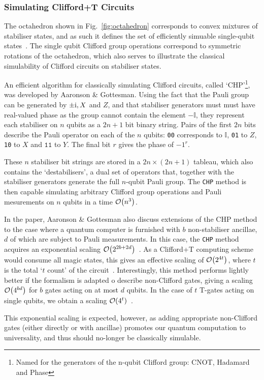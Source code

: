 \documentclass{standalone}
\begin{document}
\subsubsection{Simulating Clifford+T Circuits}\label{sec:CHP}
The octahedron shown in Fig.~\ref{fig:octahedron} corresponds to convex mixtures of stabiliser states, and as such it defines the set of efficiently simuable single-qubit states~\cite{Howard2014}. The single qubit Clifford group operations correspond to symmetric rotations of the octahedron, which also serves to illustrate the classical simulability of Clifford circuits on stabiliser states. 
\par
An efficient algorithm for classically simulating Clifford circuits, called `CHP'\footnote{Named for the generators of the n-qubit Clifford group: CNOT, Hadamard and Phase}, was developed by Aaronson \& Gottesman. Using the fact that the Pauli group can be generated by $\pm\mathrm{i}, X$ and $Z$, and that stabiliser generators must must have real-valued phase as the group cannot contain the element $-\mathbb{I}$, they represent each stabiliser on $n$ qubits as a $2n+1$ bit binary string. Pairs of the first $2n$ bits describe the Pauli operator on each of the $n$ qubits: \texttt{00} corresponds to $\mathbb{I}$, \texttt{01} to $Z$, \texttt{10} to $X$ and $\texttt{11}$ to $Y$. The final bit $r$ gives the phase of $-1^{r}$.
\par
These $n$ stabiliser bit strings are stored in a $2n\times(2n+1)$ tableau, which also contains the `destabilisers', a dual set of operators that, together with the stabiliser generators generate the full $n$-qubit Pauli group. The \texttt{CHP} method is then capable simulating arbitrary Clifford group operations and Pauli mesurements on $n$ qubits in a time $\order{n^{3}}$.
\par
In the paper, Aaronson \& Gottesman also discuss extensions of the CHP method to the case where a quantum computer is furnished with $b$ non-stabiliser ancillae, $d$ of which are subject to Pauli measurements. In this case, the \texttt{CHP} method acquires an exponential scaling $\order{2^{2b+2d}}$~\cite{Aaronson2004a}. As a Clifford+T computing scheme would consume all magic states, this gives an effective scaling of $\order{2^{4t}}$, where $t$ is the total `$t$ count' of the circuit~\cite{Bravyi2015,Aaronson2004a}. Interestingly, this method performs lightly better if the formalism is adapted o describe non-Clifford gates, giving a scaling $\order{4^{bd}}$ for $b$ gates acting on at most $d$ qubits. In the case of $t$ T-gates acting on single qubits, we obtain a scaling $\order{4^{t}}$~\cite{Aaronson2004a}.
\par
This exponential scaling is expected, however, as adding appropriate non-Clifford gates (either directly or with ancillae) promotes our quantum computation to universality, and thus should no-longer be classically simulable.
\end{document}
